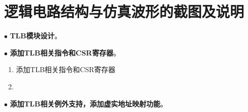 \documentclass[11pt]{article}
\begin{document}


\section{逻辑电路结构与仿真波形的截图及说明}
\noindent
$\bullet$
\textbf{TLB模块设计}。



\noindent
$\bullet$
\textbf{添加TLB相关指令和CSR寄存器}。
\vspace{1ex}
\begin{enumerate}
  \item 添加TLB相关指令和CSR寄存器

\item 
\end{enumerate}


\noindent
$\bullet$
\textbf{添加TLB相关例外支持，添加虚实地址映射功能}。
\vspace{1ex}
\end{document}
